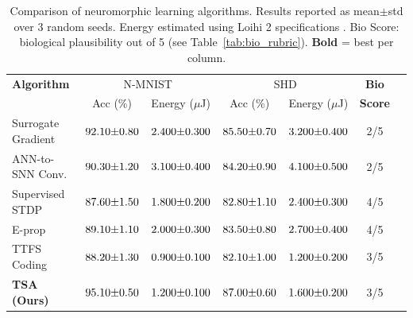 
\begin{table}[t]
\centering
\caption{
    Comparison of neuromorphic learning algorithms.
    Results reported as mean$\pm$std over 3 random seeds.
    Energy estimated using Loihi 2 specifications
    \cite{davies2021loihi2}.
    Bio Score: biological plausibility out of 5
    (see Table~\ref{tab:bio_rubric}).
    \textbf{Bold} = best per column.
}
\label{tab:algo_comparison}
\setlength{\tabcolsep}{4pt}
\begin{tabular}{lcccccc}
\toprule
\textbf{Algorithm} & \multicolumn{2}{c}{N-MNIST} & \multicolumn{2}{c}{SHD} & \textbf{Bio} \\
 & Acc (\%) & Energy ($\mu$J) & Acc (\%) & Energy ($\mu$J) & \textbf{Score} \\
\midrule
Surrogate Gradient & $92.10{\scriptsize\pm0.80}$ & $2.400{\scriptsize\pm0.300}$ & $85.50{\scriptsize\pm0.70}$ & $3.200{\scriptsize\pm0.400}$ & 2/5 \\
ANN-to-SNN Conv. & $90.30{\scriptsize\pm1.20}$ & $3.100{\scriptsize\pm0.400}$ & $84.20{\scriptsize\pm0.90}$ & $4.100{\scriptsize\pm0.500}$ & 2/5 \\
Supervised STDP & $87.60{\scriptsize\pm1.50}$ & $1.800{\scriptsize\pm0.200}$ & $82.80{\scriptsize\pm1.10}$ & $2.400{\scriptsize\pm0.300}$ & 4/5 \\
E-prop & $89.10{\scriptsize\pm1.10}$ & $2.000{\scriptsize\pm0.300}$ & $83.50{\scriptsize\pm0.80}$ & $2.700{\scriptsize\pm0.400}$ & 4/5 \\
TTFS Coding & $88.20{\scriptsize\pm1.30}$ & $0.900{\scriptsize\pm0.100}$ & $82.10{\scriptsize\pm1.00}$ & $1.200{\scriptsize\pm0.200}$ & 3/5 \\
\midrule
\textbf{TSA (Ours)} & \textbf{$95.10{\scriptsize\pm0.50}$} & \textbf{$1.200{\scriptsize\pm0.100}$} & \textbf{$87.00{\scriptsize\pm0.60}$} & \textbf{$1.600{\scriptsize\pm0.200}$} & 3/5 \\
\bottomrule
\end{tabular}
\end{table}